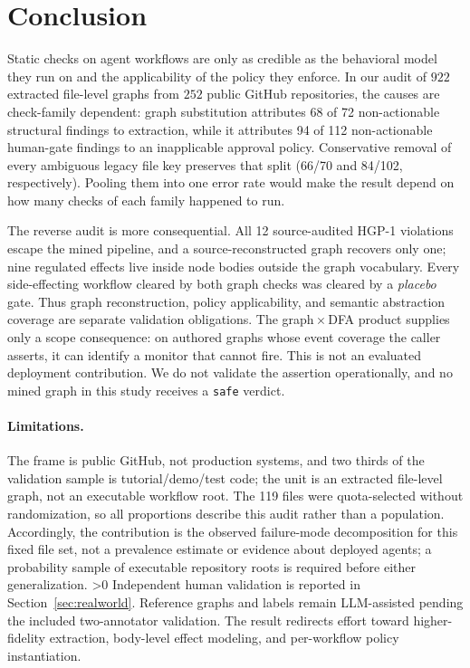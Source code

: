 \section{Conclusion}
\label{sec:conclusion}

Static checks on agent workflows are only as credible as the behavioral model
they run on and the applicability of the policy they enforce. In our audit of
$922$ extracted file-level graphs from $252$ public GitHub repositories, the
causes are check-family dependent: graph substitution attributes 68 of 72
non-actionable structural findings to extraction, while it attributes 94 of
112 non-actionable human-gate findings to an inapplicable approval policy.
Conservative removal of every ambiguous legacy file key preserves that split
(66/70 and 84/102, respectively).
Pooling them into one error rate would
make the result depend on how many checks of each family happened to run.

The reverse audit is more consequential. All 12 source-audited HGP-1 violations
escape the mined pipeline, and a source-reconstructed graph recovers only one;
nine regulated effects live inside node bodies outside the graph vocabulary.
Every side-effecting workflow cleared by both graph checks was cleared by a
\emph{placebo} gate. Thus graph reconstruction, policy applicability, and
semantic abstraction coverage are separate validation obligations. The
graph\,$\times$\,DFA product supplies only a scope consequence: on authored
graphs whose event coverage the caller asserts, it can identify a monitor that
cannot fire. This is not an evaluated deployment contribution. We do not
validate the assertion operationally, and no mined graph in this study receives
a \texttt{safe} verdict.

\paragraph{Limitations.}
The frame is public GitHub, not production systems, and two thirds of the
validation sample is tutorial/demo/test code; the unit is an extracted
file-level graph, not an executable workflow root. The 119 files were
quota-selected without randomization, so all proportions describe this audit
rather than a population. Accordingly, the contribution is the observed
failure-mode decomposition for this fixed file set, not a prevalence estimate
or evidence about deployed agents; a probability sample of executable
repository roots is required before either generalization.
\ifnum\humanNflags>0
Independent human validation is reported in Section~\ref{sec:realworld}.
\else
Reference graphs and labels remain LLM-assisted pending the included
two-annotator validation.
\fi
The result redirects effort toward higher-fidelity extraction, body-level
effect modeling, and per-workflow policy instantiation.

